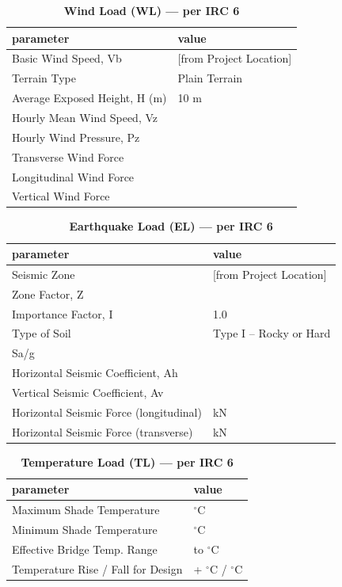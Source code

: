 \documentclass[12pt,a4paper]{report}
\numberwithin{table}{chapter}
\numberwithin{figure}{chapter}
\begin{document}
\vspace{1em}
\begin{longtable}{|L{5.5cm}|p{10.0cm}|}
\caption{\textbf{Wind Load (WL) --- per IRC 6}}
\hline
\textbf{parameter} & \textbf{value} \\
\hline
\textnormal{Basic Wind Speed, Vb} &  [from Project Location] \\[6pt]
\hline
\textnormal{Terrain Type} & Plain Terrain \\[6pt]
\hline
\textnormal{Average Exposed Height, H (m)} & 10 m \\[6pt]
\hline
\textnormal{Hourly Mean Wind Speed, Vz} &  \\[6pt]
\hline
\textnormal{Hourly Wind Pressure, Pz} &  \\[6pt]
\hline
\textnormal{Transverse Wind Force} &  \\[6pt]
\hline
\textnormal{Longitudinal Wind Force} &  \\[6pt]
\hline
\textnormal{Vertical Wind Force} &  \\[6pt]
\hline
\end{longtable}

\vspace{1em}
\begin{longtable}{|L{5.5cm}|p{10.0cm}|}
\caption{\textbf{Earthquake Load (EL) --- per IRC 6}}
\hline
\textbf{parameter} & \textbf{value} \\
\hline
\textnormal{Seismic Zone} &  [from Project Location] \\[6pt]
\hline
\textnormal{Zone Factor, Z} &  \\[6pt]
\hline
\textnormal{Importance Factor, I} & 1.0 \\[6pt]
\hline
\textnormal{Type of Soil} & Type I – Rocky or Hard \\[6pt]
\hline
\textnormal{Sa/g} &  \\[6pt]
\hline
\textnormal{Horizontal Seismic Coefficient, Ah} &  \\[6pt]
\hline
\textnormal{Vertical Seismic Coefficient, Av} &  \\[6pt]
\hline
\textnormal{Horizontal Seismic Force (longitudinal)} &  kN \\[6pt]
\hline
\textnormal{Horizontal Seismic Force (transverse)} &  kN \\[6pt]
\hline
\end{longtable}

\vspace{1em}
\begin{longtable}{|L{5.5cm}|p{10.0cm}|}
\caption{\textbf{Temperature Load (TL) --- per IRC 6}}
\hline
\textbf{parameter} & \textbf{value} \\
\hline
\textnormal{Maximum Shade Temperature} &  $^\circ$C \\[6pt]
\hline
\textnormal{Minimum Shade Temperature} &  $^\circ$C \\[6pt]
\hline
\textnormal{Effective Bridge Temp. Range} &  to  $^\circ$C \\[6pt]
\hline
\textnormal{Temperature Rise / Fall for Design} & + $^\circ$C / \textminus{} $^\circ$C \\[6pt]
\hline
\end{longtable}
\end{document}
